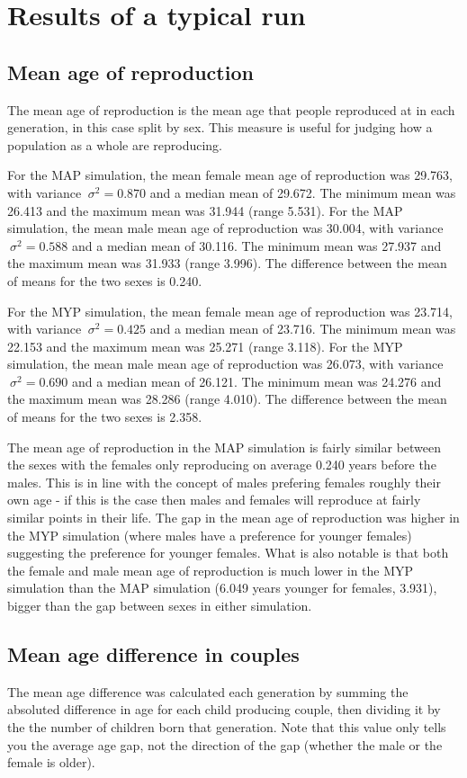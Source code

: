 \documentclass[authoryearcitations]{UoYCSproject}
\begin{document}
\section{Results of a typical run}
\subsection{Mean age of reproduction}
The mean age of reproduction is the mean age that people reproduced at in each generation, in this case split by sex. This measure is useful for judging how a population as a whole are reproducing.

For the MAP simulation, the mean female mean age of reproduction was 29.763, with variance $\ \sigma^2 = 0.870 $ and a median mean of 29.672. The minimum mean was 26.413 and the maximum mean was 31.944 (range 5.531). For the MAP simulation, the mean male mean age of reproduction was 30.004, with variance $\ \sigma^2 = 0.588 $ and a median mean of 30.116. The minimum mean was 27.937 and the maximum mean was 31.933 (range 3.996). The difference between the mean of means for the two sexes is 0.240.

For the MYP simulation, the mean female mean age of reproduction was 23.714, with variance $\ \sigma^2 = 0.425 $ and a median mean of 23.716. The minimum mean was 22.153 and the maximum mean was 25.271 (range 3.118). For the MYP simulation, the mean male mean age of reproduction was 26.073, with variance $\ \sigma^2 = 0.690 $ and a median mean of 26.121. The minimum mean was 24.276 and the maximum mean was 28.286 (range 4.010). The difference between the mean of means for the two sexes is 2.358.
 
The mean age of reproduction in the MAP simulation is fairly similar between the sexes with the females only reproducing on average 0.240 years before the males. This is in line with the concept of males prefering females roughly their own age - if this is the case then males and females will reproduce at fairly similar points in their life. The gap in the mean age of reproduction was higher in the MYP simulation (where males have a preference for younger females) suggesting the preference for younger females. What is also notable is that both the female and male mean age of reproduction is much lower in the MYP simulation than the MAP simulation (6.049 years younger for females, 3.931), bigger than the gap between sexes in either simulation.

\subsection{Mean age difference in couples}
The mean age difference was calculated each generation by summing the absoluted difference in age for each child producing couple, then dividing it by the the number of children born that generation. Note that this value only tells you the average age gap, not the direction of the gap (whether the male or the female is older).
\end{document}
